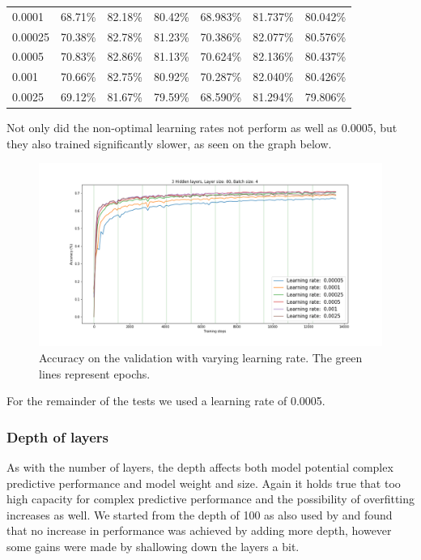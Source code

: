 \begin{table}[H]
\begin{tabular}{lcccccc}
\multicolumn{1}{l|}{0.0001} & 68.71\% & 82.18\% & \multicolumn{1}{c|}{80.42\%} & 68.983\% & 81.737\% & 80.042\% \\
\multicolumn{1}{l|}{0.00025} & 70.38\% & 82.78\% & \multicolumn{1}{c|}{81.23\%} & 70.386\% & 82.077\% & 80.576\% \\
\multicolumn{1}{l|}{0.0005} & 70.83\% & 82.86\% & \multicolumn{1}{c|}{81.13\%} & 70.624\% & 82.136\% & 80.437\% \\
\multicolumn{1}{l|}{0.001} & 70.66\% & 82.75\% & \multicolumn{1}{c|}{80.92\%} & 70.287\% & 82.040\% & 80.426\% \\
\multicolumn{1}{l|}{0.0025} & 69.12\% & 81.67\% & \multicolumn{1}{c|}{79.59\%} & 68.590\% & 81.294\% & 79.806\%
\end{tabular}
\end{table}
\noindent Not only did the non-optimal learning rates not perform as well as 0.0005, but they also trained significantly slower, as seen on the graph below.
\begin{figure}[H]
  \centering
  \includegraphics[width=\linewidth]{../graphs/new/learning_rate}
  \caption{Accuracy on the validation with varying learning rate. The green lines represent epochs.}
\end{figure}
For the remainder of the tests we used a learning rate of 0.0005.

\subsubsection{Depth of layers}
As with the number of layers, the depth affects both model potential complex predictive performance and model weight and size. Again it holds true that too high capacity for complex predictive performance and the possibility of overfitting increases as well. We started from the depth of 100 as also used by \citeauthor{wang-et-al-2016} and found that no increase in performance was achieved by adding more depth, however some gains were made by shallowing down the layers a bit.

